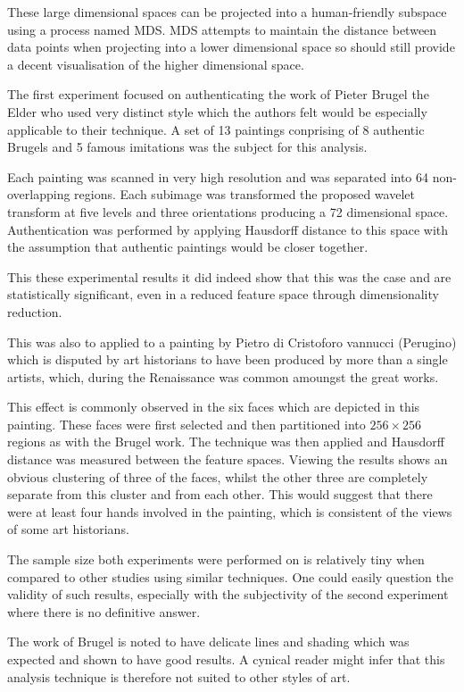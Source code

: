 \documentclass[conference]{IEEEtran}
\begin{document}
These large dimensional spaces can be projected into a human-friendly subspace
using a process named \gls{MDS}. \Gls{MDS} attempts to maintain the distance
between data points when projecting into a lower dimensional space so should
still provide a decent visualisation of the higher dimensional space.

The first experiment focused on authenticating the work of Pieter Brugel the
Elder who used very distinct style which the authors felt would be especially
applicable to their technique. A set of 13 paintings conprising of 8 authentic
Brugels and 5 famous imitations was the subject for this analysis.

Each painting was scanned in very high resolution and was separated into 64
non-overlapping regions. Each subimage was transformed the proposed wavelet
transform at five levels and three orientations producing a 72 dimensional
space. Authentication was performed by applying Hausdorff distance to this
space with the assumption that authentic paintings would be closer together.

This these experimental results it did indeed show that this was the case and
are statistically significant, even in a reduced feature space through
dimensionality reduction.

This was also to applied to a painting by Pietro di Cristoforo vannucci
(Perugino) which is disputed by art historians to have been produced by more
than a single artists, which, during the Renaissance was common amoungst the
great works.

This effect is commonly observed in the six faces which are depicted in this
painting. These faces were first selected and then partitioned into $256 \times
256$ regions as with the Brugel work. The technique was then applied and
Hausdorff distance was measured between the feature spaces. Viewing the results
shows an obvious clustering of three of the faces, whilst the other three are
completely separate from this cluster and from each other. This would suggest
that there were at least four hands involved in the painting, which is
consistent of the views of some art historians.

The sample size both experiments were performed on is relatively tiny when
compared to other studies using similar techniques. One could easily question
the validity of such results, especially with the subjectivity of the second
experiment where there is no definitive answer.

The work of Brugel is noted to have delicate lines and shading which was
expected and shown to have good results. A cynical reader might infer that this
analysis technique is therefore not suited to other styles of art.
\end{document}
